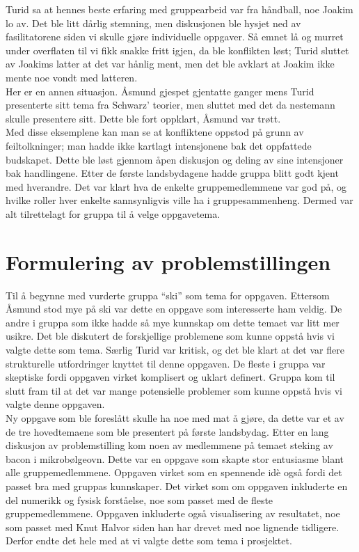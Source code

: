 Turid sa at hennes beste erfaring med gruppearbeid var fra håndball, noe Joakim
lo av. Det ble litt dårlig stemning, men diskusjonen ble hysjet ned av
fasilitatorene siden vi skulle gjøre individuelle oppgaver. Så emnet lå og
murret under overflaten til vi fikk snakke fritt igjen, da ble konflikten løst;
Turid sluttet av Joakims latter at det var hånlig ment, men det ble avklart at
Joakim ikke mente noe vondt med latteren.\\

Her er en annen situasjon. Åsmund gjespet gjentatte ganger mens Turid
presenterte sitt tema fra Schwarz’ teorier, men sluttet med det da nestemann
skulle presentere sitt.  Dette ble fort oppklart, Åsmund var trøtt.\\

Med disse eksemplene kan man se at konfliktene oppstod på grunn av
feiltolkninger; man hadde ikke kartlagt intensjonene bak det oppfattede
budskapet. Dette ble løst gjennom åpen diskusjon og deling av sine intensjoner
bak handlingene.  Etter de første landsbydagene hadde gruppa blitt godt kjent
med hverandre. Det var klart hva de enkelte gruppemedlemmene var god på, og
hvilke roller hver enkelte sannsynligvis ville ha i gruppesammenheng. Dermed var
alt tilrettelagt for gruppa til å velge oppgavetema.\\

\section{Formulering av problemstillingen}
Til å begynne med vurderte gruppa ``ski'' som tema for oppgaven. Ettersom Åsmund
stod mye på ski var dette en oppgave som interesserte ham veldig. De andre i
gruppa som ikke hadde så mye kunnskap om dette temaet var litt mer usikre. Det
ble diskutert de forskjellige problemene som kunne oppstå hvis vi valgte dette
som tema. Særlig Turid var kritisk, og det ble klart at det var flere
strukturelle utfordringer knyttet til denne oppgaven. De fleste i gruppa var
skeptiske fordi oppgaven virket komplisert og uklart definert. Gruppa kom til
slutt fram til at det var mange potensielle problemer som kunne oppstå hvis vi
valgte denne oppgaven.\\

Ny oppgave som ble foreslått skulle ha noe med mat å gjøre, da dette var et av
de tre hovedtemaene som ble presentert på første landsbydag. Etter en lang
diskusjon av problemstilling kom noen av medlemmene på temaet steking av bacon i
mikrobølgeovn. Dette var en oppgave som skapte stor entusiasme blant alle                    %
gruppemedlemmene. Oppgaven virket som en spennende idè også fordi det
passet bra med gruppas kunnskaper. Det virket som om oppgaven inkluderte en del
numerikk og fysisk forståelse, noe som passet med de fleste gruppemedlemmene.
Oppgaven inkluderte også visualisering av resultatet, noe som passet med Knut
Halvor siden han har drevet med noe lignende tidligere. Derfor endte det hele
med at vi valgte dette som tema i prosjektet.\\

